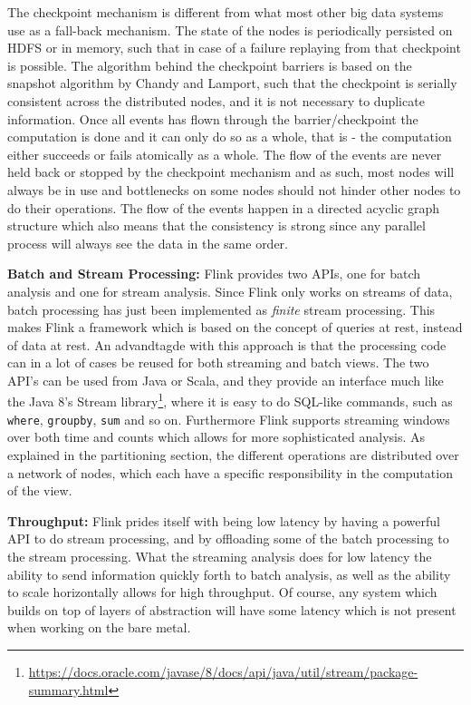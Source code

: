 The checkpoint mechanism is different from what most other big data systems use as a fall-back mechanism. The state of the nodes is periodically persisted on HDFS or in memory, such that in case of a failure replaying from that checkpoint is possible. The algorithm behind the checkpoint barriers is based on the snapshot algorithm by Chandy and Lamport\cite{data-artisan-flink}, such that the checkpoint is serially consistent across the distributed nodes, and it is not necessary to duplicate information. Once all events has flown through the barrier/checkpoint the computation is done and it can only do so as a whole, that is - the computation either succeeds or fails atomically as a whole. The flow of the events are never held back or stopped by the checkpoint mechanism and as such, most nodes will always be in use and bottlenecks on some nodes should not hinder other nodes to do their operations. The flow of the events happen in a directed acyclic graph structure which also means that the consistency is strong since any parallel process will always see the data in the same order\cite{data-artisan-flink}.

\newpar \textbf{Batch and Stream Processing:} Flink provides two APIs, one for batch analysis and one for stream analysis. Since Flink only works on streams of data, batch processing has just been implemented as \textit{finite} stream processing. This makes Flink a framework which is based on the concept of queries at rest, instead of data at rest. An advandtagde with this approach is that the processing code can in a lot of cases be reused for both streaming and batch views. The two API's can be used from Java or Scala, and they provide an interface much like the Java 8's Stream library\footnote{ \url{https://docs.oracle.com/javase/8/docs/api/java/util/stream/package-summary.html}}, where it is easy to do SQL-like commands, such as \texttt{where}, \texttt{groupby}, \texttt{sum} and so on. Furthermore Flink supports streaming windows over both time and counts which allows for more sophisticated analysis. As explained in the partitioning section, the different operations are distributed over a network of nodes, which each have a specific responsibility in the computation of the view.

\newpar \textbf{Throughput:} Flink prides itself with being low latency by having a powerful API to do stream processing, and by offloading some of the batch processing to the stream processing. What the streaming analysis does for low latency the ability to send information quickly forth to batch analysis, as well as the ability to scale horizontally allows for high throughput. Of course, any system which builds on top of layers of abstraction will have some latency which is not present when working on the bare metal.

